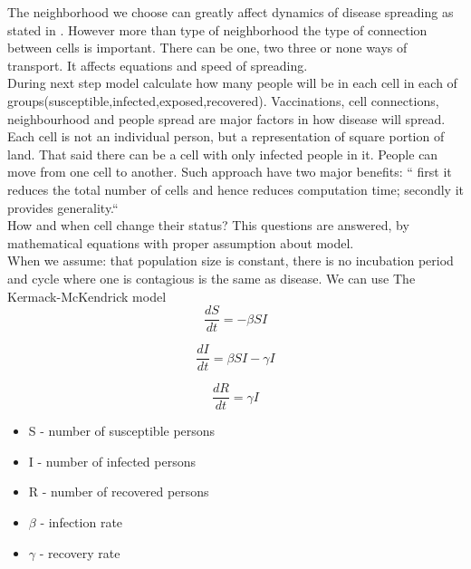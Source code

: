\documentclass[a4paper, 11pt]{article}
\begin{document}
	The neighborhood we choose can greatly affect dynamics of disease spreading as stated in \cite{cisse}. However more than type of neighborhood the type of connection between cells is important. There can be one, two three or none ways of transport. It affects equations and speed of spreading.\cite{WHITE} \\

		During next step model calculate how many people will be in each cell in each of groups(susceptible,infected,exposed,recovered). Vaccinations, cell connections, neighbourhood and people spread are major factors in how disease will spread.\\	
	
	Each cell is not an individual person, but a representation of square portion of land. That said there can be a cell with only infected people in it. People can move from one cell to another.\cite{WHITE}   Such approach have two major benefits: ``  first it reduces the total number of cells and hence reduces computation time; secondly it provides generality.``\cite{shih}\\
	

	How and when cell change their status? This questions are answered, by mathematical equations with proper assumption about model.\\
	When we assume: that population size is constant, there is no incubation period and cycle where one is contagious is the same as disease.  We can use The Kermack-McKendrick model\cite{report} \\
	\begin{equation}
	\frac{dS}{dt}=-\beta SI
	\end{equation}
	
	\begin{equation}
	\frac{dI}{dt}=\beta SI-\gamma I
	\end{equation}
	
	\begin{equation}
	\frac{dR}{dt}=\gamma I
	\end{equation}
	\begin{itemize}
		\item S - number of susceptible persons
		\item I - number of infected persons
		\item R - number of recovered persons
		\item $\beta$ - infection rate
		\item $\gamma$ - recovery rate
	\end{itemize}
	
\end{document}
